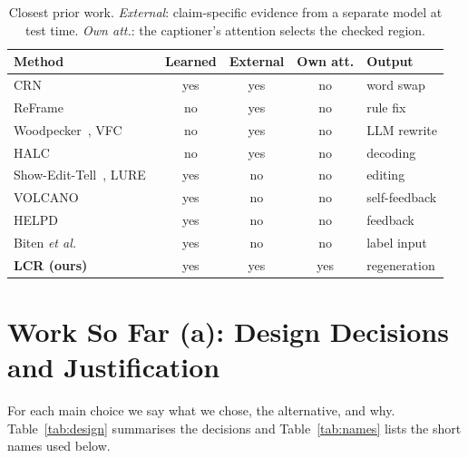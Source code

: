 \documentclass[conference]{IEEEtran}
\begin{document}
\begin{table}[t]
\caption{Closest prior work. \emph{External}: claim-specific evidence from a separate model at test time.
\emph{Own att.}: the captioner's attention selects the checked region.}
\label{tab:prior}
\centering\footnotesize\setlength{\tabcolsep}{2.5pt}
\begin{tabular}{@{}lcccl@{}}
\toprule
Method & Learned & External & Own att. & Output \\
\midrule
CRN~\cite{feng2020cascaded} & yes & yes & no & word swap \\
ReFrame~\cite{adhikary2024reframe} & no & yes & no & rule fix \\
Woodpecker~\cite{yin2024woodpecker}, VFC~\cite{ge2024visual} & no & yes & no & LLM rewrite \\
HALC~\cite{chen2024halc} & no & yes & no & decoding \\
Show-Edit-Tell~\cite{sammani2020show}, LURE~\cite{zhou2024analyzing} & yes & no & no & editing \\
VOLCANO~\cite{lee2024volcano} & yes & no & no & self-feedback \\
HELPD~\cite{yuan2024helpd} & yes & no & no & feedback \\
Biten \emph{et al.}~\cite{biten2022let} & yes & no & no & label input \\
\midrule
\textbf{LCR (ours)} & yes & yes & yes & regeneration \\
\bottomrule
\end{tabular}
\end{table}

\section{Work So Far (a): Design Decisions and Justification}
\label{sec:design}

For each main choice we say what we chose, the alternative, and why. Table~\ref{tab:design} summarises the
decisions and Table~\ref{tab:names} lists the short names used below.
\end{document}
